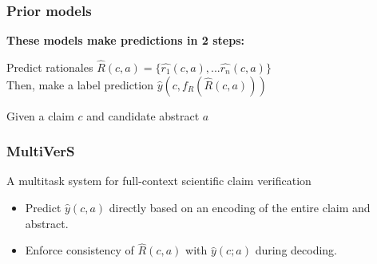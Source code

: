 \documentclass[13.5pt,aspecratio=169, xcolor=dvipsnames]{beamer}
\begin{document}
    

    \begin{frame}
        \onehalfspacing
        \frametitle{Prior models}
        \textbf{These models make predictions in 2 steps:}
        \vspace*{-1em} 
        \begin{mybox}
            Predict rationales $ \hat{R}(c,a) = \{ \hat{r_1}(c,a),... \hat{r_n}(c,a)\}$ \\
            Then, make a label prediction $\hat{y}(c, f_R(\hat{R}(c,a)))$
          \end{mybox}
        
        \begin{minipage}{0.6\textwidth}
            \begin{block}{}
                Given a claim $c$ and candidate abstract $a$
            \end{block}
        \end{minipage}
    
    \end{frame}
        
    
    \begin{frame}
        \onehalfspacing
        \frametitle{MultiVerS}
        \begin{block}{A multitask system for full-context scientific claim verification}
            \begin{itemize}
                \item Predict $\hat{y}(c, a)$ directly based on an encoding of the entire claim and abstract.
                \item Enforce consistency of $\hat{R}(c, a)$ with $\hat{y}(c; a)$ during decoding.
            \end{itemize}
        \end{block}
    \end{frame}
        
\end{document}
